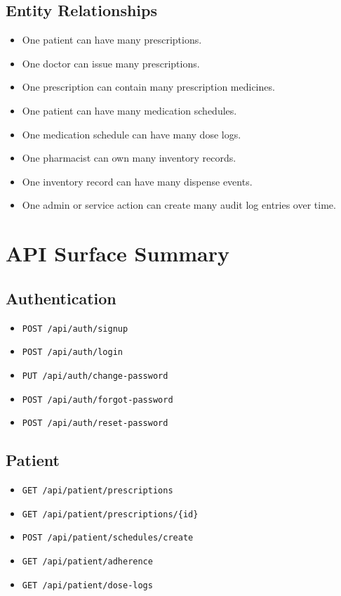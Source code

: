 \documentclass[12pt,a4paper]{article}
\begin{document}
\subsection{Entity Relationships}
\begin{itemize}[leftmargin=*]
  \item One patient can have many prescriptions.
  \item One doctor can issue many prescriptions.
  \item One prescription can contain many prescription medicines.
  \item One patient can have many medication schedules.
  \item One medication schedule can have many dose logs.
  \item One pharmacist can own many inventory records.
  \item One inventory record can have many dispense events.
  \item One admin or service action can create many audit log entries over time.
\end{itemize}

\section{API Surface Summary}
\subsection{Authentication}
\begin{itemize}[leftmargin=*]
  \item \texttt{POST /api/auth/signup}
  \item \texttt{POST /api/auth/login}
  \item \texttt{PUT /api/auth/change-password}
  \item \texttt{POST /api/auth/forgot-password}
  \item \texttt{POST /api/auth/reset-password}
\end{itemize}

\subsection{Patient}
\begin{itemize}[leftmargin=*]
  \item \texttt{GET /api/patient/prescriptions}
  \item \texttt{GET /api/patient/prescriptions/\{id\}}
  \item \texttt{POST /api/patient/schedules/create}
  \item \texttt{GET /api/patient/adherence}
  \item \texttt{GET /api/patient/dose-logs}
\end{itemize}
\end{document}

